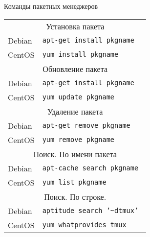 \begin{frame}{Команды пакетных менеджеров}
        \begin{tabular}{ll}
            \multicolumn{2}{c}{Установка пакета }   \tabularnewline
            Debian & {\tt apt-get \alert{install} pkgname } \\
            CentOS & {\tt yum \alert{install} pkgname } \\
            \multicolumn{2}{c}{Обновление пакета }  \tabularnewline
            Debian & {\tt apt-get \alert{install} pkgname } \\
            CentOS & {\tt yum \alert{update} pkgname }  \\
            \multicolumn{2}{c}{Удаление пакета }   \tabularnewline
            Debian & {\tt apt-get \alert{remove} pkgname } \\ 
            CentOS & {\tt yum \alert{remove} pkgname }  \\
            \multicolumn{2}{c}{Поиск. По имени пакета}   \tabularnewline
            Debian & {\tt apt-cache \alert{search} pkgname } \\
            CentOS & {\tt yum \alert{list} pkgname }  \\
            \multicolumn{2}{c}{Поиск. По строке.}   \tabularnewline
            Debian & {\tt aptitude \alert{search} '\alert{\textasciitilde d}tmux' } \\
            CentOS & {\tt yum \alert{whatprovides} tmux} 
        \end{tabular}
\end{frame}
